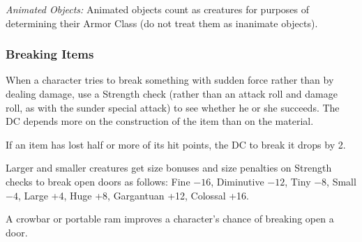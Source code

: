 \textit{Animated Objects:} Animated objects count as creatures for purposes of determining their Armor Class (do not treat them as inanimate objects).

\subsubsection{Breaking Items}
When a character tries to break something with sudden force rather than by dealing damage, use a Strength check (rather than an attack roll and damage roll, as with the sunder special attack) to see whether he or she succeeds. The DC depends more on the construction of the item than on the material.

If an item has lost half or more of its hit points, the DC to break it drops by 2.

Larger and smaller creatures get size bonuses and size penalties on Strength checks to break open doors as follows: Fine $-16$, Diminutive $-12$, Tiny $-8$, Small $-4$, Large +4, Huge +8, Gargantuan +12, Colossal +16.

A crowbar or portable ram improves a character's chance of breaking open a door.
